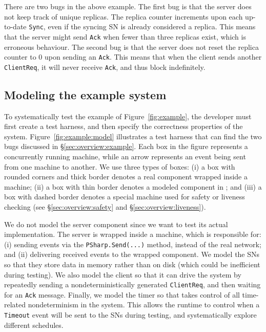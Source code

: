 There are two bugs in the above example. The first bug is that the server does not keep track of unique replicas. The replica counter increments upon each up-to-date \texttt{Sync}, even if the syncing SN is already considered a replica. This means that the server might send \texttt{Ack} when fewer than three replicas exist, which is erroneous behaviour. The second bug is that the server does not reset the replica counter to 0 upon sending an \texttt{Ack}. This means that when the client sends another \texttt{ClientReq}, it will never receive \texttt{Ack}, and thus block indefinitely.

\vspace{-1mm}
\subsection{Modeling the example system}
\label{sec:overview:model}

To systematically test the example of Figure~\ref{fig:example}, the developer must first create a \psharp test harness, and then specify the correctness properties of the system. Figure~\ref{fig:example:model} illustrates a test harness that can find the two bugs discussed in \S\ref{sec:overview:example}. Each box in the figure represents a concurrently running \psharp machine, while an arrow represents an event being sent from one machine to another. We use three types of boxes: (i) a box with rounded corners and thick border denotes a real component wrapped inside a \psharp machine; (ii) a box with thin border denotes a modeled component in \psharp; and (iii) a box with dashed border denotes a special \psharp machine used for safety or liveness checking (see \S\ref{sec:overview:safety} and \S\ref{sec:overview:liveness}).

We do not model the server component since we want to test its actual implementation. The server is wrapped inside a \psharp machine, which is responsible for: (i) sending events via the \texttt{PSharp.Send(...)} method, instead of the real network; and (ii) delivering received events to the wrapped component. We model the SNs so that they store data in memory rather than on disk (which could be inefficient during testing). We also model the client so that it can drive the system by repeatedly sending a nondeterministically generated \texttt{ClientReq}, and then waiting for an \texttt{Ack} message. Finally, we model the timer so that \psharp takes control of all time-related nondeterminism in the system. This allows the \psharp runtime to control when a \texttt{Timeout} event will be sent to the SNs during testing, and systematically explore different schedules.

